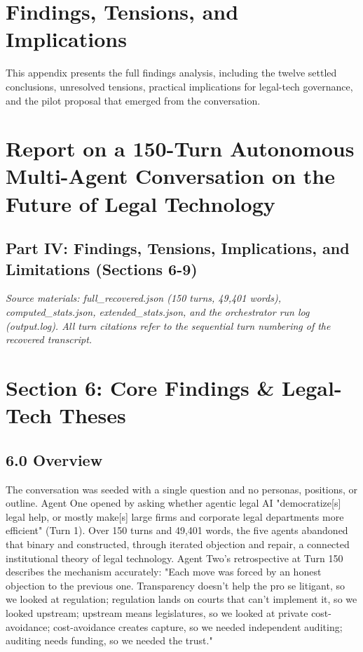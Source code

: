 \documentclass[sigconf,nonacm=true]{acmart}
\begin{document}
\section{Findings, Tensions, and Implications}
\label{app:findings}

This appendix presents the full findings analysis, including the twelve settled conclusions, unresolved tensions, practical implications for legal-tech governance, and the pilot proposal that emerged from the conversation.

\section{Report on a 150-Turn Autonomous Multi-Agent Conversation on the Future of Legal Technology}

\subsection{Part IV: Findings, Tensions, Implications, and Limitations (Sections 6-9)}

\textit{Source materials: full\_recovered.json (150 turns, 49,401 words), computed\_stats.json, extended\_stats.json, and the orchestrator run log (output.log). All turn citations refer to the sequential turn numbering of the recovered transcript.}

\section{Section 6: Core Findings \& Legal-Tech Theses}

\subsection{6.0 Overview}

The conversation was seeded with a single question and no personas, positions, or outline. Agent One opened by asking whether agentic legal AI "democratize[s] legal help, or mostly make[s] large firms and corporate legal departments more efficient" (Turn 1). Over 150 turns and 49,401 words, the five agents abandoned that binary and constructed, through iterated objection and repair, a connected institutional theory of legal technology. Agent Two's retrospective at Turn 150 describes the mechanism accurately: "Each move was forced by an honest objection to the previous one. Transparency doesn't help the pro se litigant, so we looked at regulation; regulation lands on courts that can't implement it, so we looked upstream; upstream means legislatures, so we looked at private cost-avoidance; cost-avoidance creates capture, so we needed independent auditing; auditing needs funding, so we needed the trust."
\end{document}
